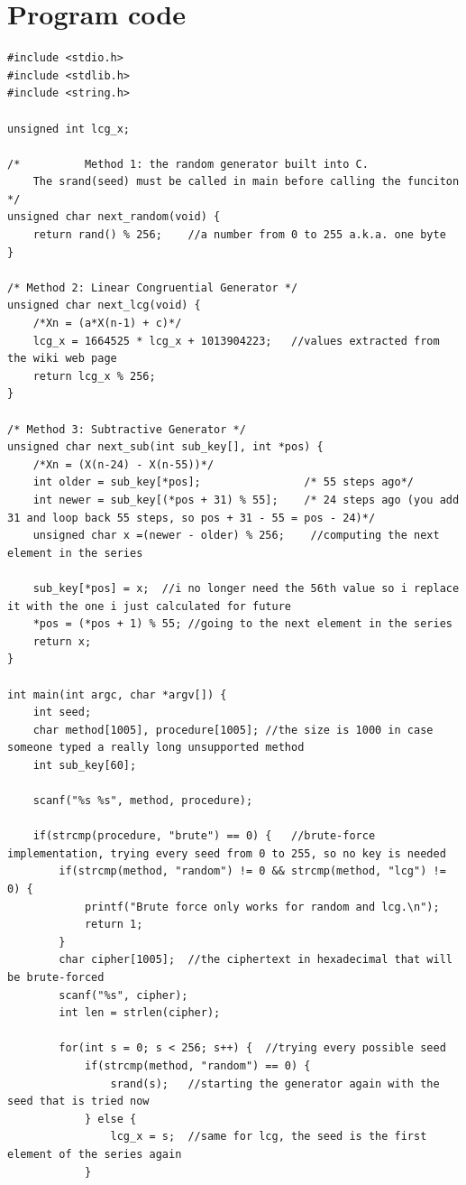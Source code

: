 \documentclass[a4paper,10pt]{article}
\begin{document}
\section{Program code}
\begin{lstlisting}[style = code, title = Enigma++.c]
#include <stdio.h>
#include <stdlib.h>
#include <string.h>

unsigned int lcg_x;

/*          Method 1: the random generator built into C.
    The srand(seed) must be called in main before calling the funciton */
unsigned char next_random(void) {
    return rand() % 256;    //a number from 0 to 255 a.k.a. one byte
}

/* Method 2: Linear Congruential Generator */
unsigned char next_lcg(void) {
    /*Xn = (a*X(n-1) + c)*/
    lcg_x = 1664525 * lcg_x + 1013904223;   //values extracted from the wiki web page
    return lcg_x % 256;
}

/* Method 3: Subtractive Generator */
unsigned char next_sub(int sub_key[], int *pos) {
    /*Xn = (X(n-24) - X(n-55))*/
    int older = sub_key[*pos];                /* 55 steps ago*/
    int newer = sub_key[(*pos + 31) % 55];    /* 24 steps ago (you add 31 and loop back 55 steps, so pos + 31 - 55 = pos - 24)*/
    unsigned char x =(newer - older) % 256;    //computing the next element in the series
    
    sub_key[*pos] = x;  //i no longer need the 56th value so i replace it with the one i just calculated for future 
    *pos = (*pos + 1) % 55; //going to the next element in the series
    return x;
}

int main(int argc, char *argv[]) {
    int seed;
    char method[1005], procedure[1005]; //the size is 1000 in case someone typed a really long unsupported method
    int sub_key[60];

    scanf("%s %s", method, procedure);

    if(strcmp(procedure, "brute") == 0) {   //brute-force implementation, trying every seed from 0 to 255, so no key is needed
        if(strcmp(method, "random") != 0 && strcmp(method, "lcg") != 0) {
            printf("Brute force only works for random and lcg.\n");
            return 1;
        }
        char cipher[1005];  //the ciphertext in hexadecimal that will be brute-forced
        scanf("%s", cipher);
        int len = strlen(cipher);

        for(int s = 0; s < 256; s++) {  //trying every possible seed
            if(strcmp(method, "random") == 0) {
                srand(s);   //starting the generator again with the seed that is tried now
            } else {
                lcg_x = s;  //same for lcg, the seed is the first element of the series again
            }


\end{lstlisting}
\end{document}

